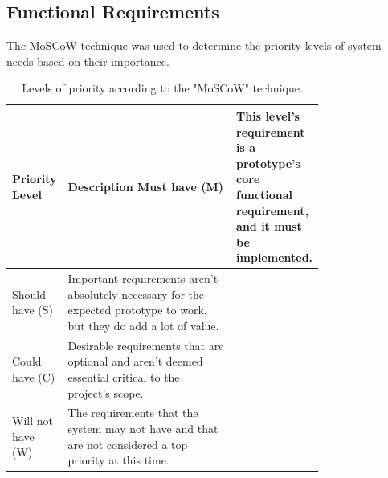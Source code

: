 \subsection{Functional Requirements}
The MoSCoW technique was used to determine the priority levels of system needs based on their importance.

\begin{longtable}{|l|p{0.77\linewidth}|}
\caption{Levels of priority according to the "MoSCoW" technique.}\\ 
\hline
\textbf{Priority Level} & \textbf{Description}                                                                                                    \endfirsthead 
\hline
Must have (M)           & This level's requirement is a prototype's core functional requirement, and it must be implemented.                      \\ 
\hline
Should have (S)         & Important requirements aren't absolutely necessary for the expected prototype to work, but they do add a lot of value.  \\ 
\hline
Could have (C)          & Desirable requirements that are optional and aren't deemed essential critical to the project's scope.                   \\ 
\hline
Will not have (W)       & The requirements that the system may not have and that are not considered a top priority at this time.                  \\
\hline
\end{longtable}


